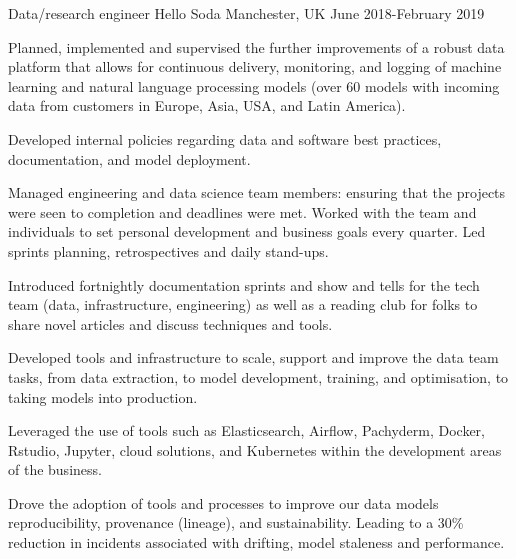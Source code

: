 \begin{cventries}

\cventry
{Data/research engineer} %
{Hello Soda } %
{Manchester, UK} %
{June 2018-February 2019 } %
{ %
\begin{cvitems}
\item {Planned, implemented and supervised the further improvements of a robust data platform that allows for continuous delivery, monitoring, and logging of machine learning and natural language processing models (over 60 models with incoming data from customers in Europe, Asia, USA, and Latin America).}
\item{Developed internal policies regarding data and software best practices, documentation, and model deployment. }
\item{Managed engineering and data science team members: ensuring that the projects were seen to completion and deadlines were met. Worked with the team and individuals to set personal development and business goals every quarter. Led sprints planning, retrospectives and daily stand-ups.}
\item{Introduced fortnightly documentation sprints and show and tells for the tech team (data, infrastructure, engineering) as well as a reading club for folks to share novel articles and discuss techniques and tools.} 
\item{Developed tools and infrastructure to scale, support and improve the data team tasks, from data extraction, to model development, training, and optimisation, to taking models into production.}
\item{Leveraged the use of tools such as Elasticsearch, Airflow, Pachyderm, Docker, Rstudio, Jupyter, cloud solutions, and Kubernetes within the development areas of the business.}
\item{Drove the adoption of tools and processes to improve our data models reproducibility, provenance (lineage), and sustainability. Leading to a 30\% reduction in incidents associated with drifting, model staleness and performance.}
\end{cvitems}
}



\end{cventries}
